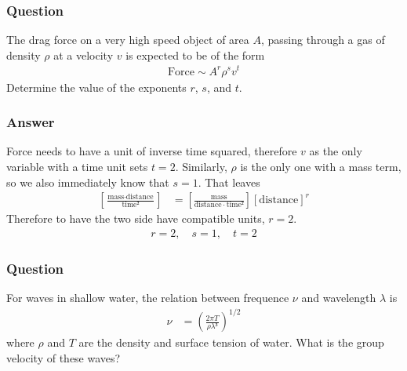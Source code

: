 \subsubsection{Question}

The drag force on a very high speed object of area $A$, passing through a gas
of density $ρ$ at a velocity $v$ is expected to be of the form
\begin{align*}
    \text{Force} \sim A^r ρ^s v^t
\end{align*}
Determine the value of the exponents $r$, $s$, and $t$.

\subsubsection{Answer}

Force needs to have a unit of inverse time squared, therefore $v$ as the only
variable with a time unit sets $t = 2$. Similarly, $ρ$ is the only one with
a mass term, so we also immediately know that $s = 1$. That leaves
\begin{align*}
    \left[ \frac{\text{mass}⋅\text{distance}}{\text{time}²} \right]
	&= \left[ \frac{\text{mass}}{\text{distance}⋅\text{time}²} \right]
	\left[ \text{distance} \right]^r
\end{align*}
Therefore to have the two side have compatible units, $r = 2$.
\begin{align*}
    \boxed{ r = 2,\quad s = 1,\quad t = 2}
\end{align*}

\subsubsection{Question}

For waves in shallow water, the relation between frequence $ν$ and wavelength
$λ$ is
\begin{align*}
    ν &= (\frac{2πT}{ρλ³})^{1/2}
\end{align*}
where $ρ$ and $T$ are the density and surface tension of water. What is the
group velocity of these waves?

